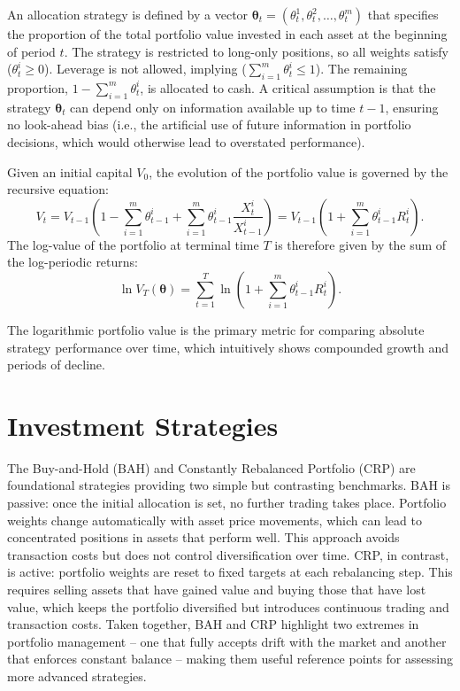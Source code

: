 \documentclass[12pt,a4paper]{report}
\begin{document}
An allocation strategy \citep{Malkiel2019} is defined by a vector \( \boldsymbol{\theta}_t = (\theta^1_t, \theta^2_t, \ldots, \theta^m_t) \) that specifies the proportion of the total portfolio value invested in each asset at the beginning of period \( t \). The strategy is restricted to long-only positions, so all weights satisfy (\( \theta^i_t \geq 0 \)). Leverage is not allowed, implying (\( \sum_{i=1}^m \theta^i_t \leq 1 \)). The remaining proportion, \( 1 - \sum_{i=1}^m \theta^i_t \), is allocated to cash. A critical assumption is that the strategy \( \boldsymbol{\theta}_t \) can depend only on information available up to time \( t-1 \), ensuring no look-ahead bias (i.e., the artificial use of future information in portfolio decisions, which would otherwise lead to overstated performance).

Given an initial capital \( V_0 \), the evolution of the portfolio value is governed by the recursive equation:
\begin{equation}
V_t = V_{t-1} \left( 1 - \sum_{i=1}^m \theta^i_{t-1} + \sum_{i=1}^m \theta^i_{t-1} \frac{X^i_t}{X^i_{t-1}} \right) = V_{t-1} \left(1 + \sum_{i=1}^m \theta^i_{t-1} R^i_t \right).
\label{eq:value_recursive}
\end{equation}
The log-value of the portfolio at terminal time \( T \) is therefore given by the sum of the log-periodic returns:
\begin{equation}
\ln V_T(\boldsymbol{\theta}) = \sum_{t=1}^{T} \ln\left(1 + \sum_{i=1}^m \theta^i_{t-1} R^i_t \right).
\label{eq:log_value}
\end{equation}

The logarithmic portfolio value is the primary metric for comparing absolute strategy performance over time, which intuitively shows compounded growth and periods of decline.

\section{Investment Strategies}
\label{sec:strategies}

The Buy-and-Hold (BAH) and Constantly Rebalanced Portfolio (CRP) are foundational strategies providing two simple but contrasting benchmarks. BAH is passive: once the initial allocation is set, no further trading takes place. Portfolio weights change automatically with asset price movements, which can lead to concentrated positions in assets that perform well. This approach avoids transaction costs but does not control diversification over time. CRP, in contrast, is active: portfolio weights are reset to fixed targets at each rebalancing step. This requires selling assets that have gained value and buying those that have lost value, which keeps the portfolio diversified but introduces continuous trading and transaction costs. Taken together, BAH and CRP highlight two extremes in portfolio management -- one that fully accepts drift with the market and another that enforces constant balance -- making them useful reference points for assessing more advanced strategies.
\end{document}
